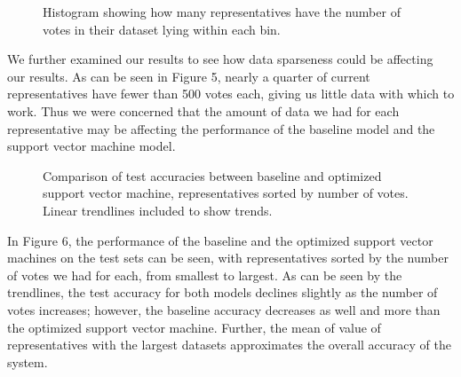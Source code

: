 \documentclass[11pt,letterpaper,twocolumn]{article}
\begin{document}
\begin{figure}
\centering
{}
\caption{Histogram showing how many representatives have the number of votes in their dataset lying within each bin.}
\end{figure}

We further examined our results to see how data sparseness could be affecting our results. As can be seen in Figure 5, nearly a quarter of current representatives have fewer than 500 votes each, giving us little data with which to work. Thus we were concerned that the amount of data we had for each representative may be affecting the performance of the baseline model and the support vector machine model.

\begin{figure}[t]
\centering
{}
\caption{Comparison of test accuracies between baseline and optimized support vector machine, representatives sorted by number of votes. Linear trendlines included to show trends.}
\end{figure}

In Figure 6, the performance of the baseline and the optimized support vector machines on the test sets can be seen, with representatives sorted by the number of votes we had for each, from smallest to largest. As can be seen by the trendlines, the test accuracy for both models declines slightly as the number of votes increases; however, the baseline accuracy decreases as well and more than the optimized support vector machine. Further, the mean of value of representatives with the largest datasets approximates the overall accuracy of the system.
\end{document}
